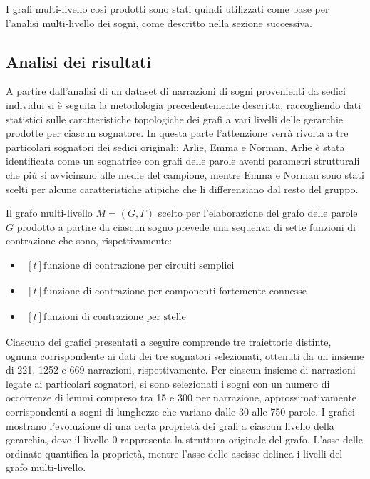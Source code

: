 I grafi multi-livello così prodotti sono stati quindi utilizzati come base per l'analisi multi-livello dei sogni,
come descritto nella sezione successiva.

\subsection{Analisi dei risultati}
A partire dall'analisi di un dataset di narrazioni di sogni provenienti da sedici individui si è seguita la
metodologia precedentemente descritta, raccogliendo dati statistici sulle caratteristiche topologiche
dei grafi a vari livelli delle gerarchie prodotte per ciascun sognatore.
In questa parte l'attenzione verrà rivolta a tre particolari sognatori dei sedici originali: Arlie, Emma e Norman.
Arlie è stata identificata come un sognatrice con grafi delle parole aventi parametri strutturali che più si
avvicinano alle medie del campione, mentre Emma e Norman sono stati scelti per alcune caratteristiche atipiche
che li differenziano dal resto del gruppo.

Il grafo multi-livello $M = (G, \Gamma)$ scelto per l'elaborazione del grafo delle parole $G$ prodotto a partire
da ciascun sogno prevede una sequenza di sette funzioni di contrazione che sono, rispettivamente:
\begin{itemize}
    \item {}
    $ \begin{aligned}[t]
      \text{funzione di contrazione per circuiti semplici}
      \end{aligned} $
    \item {}
    $ \begin{aligned}[t]
      \text{funzione di contrazione per componenti fortemente connesse}
      \end{aligned} $
    \item {}
    $ \begin{aligned}[t]
      \text{funzioni di contrazione per stelle}
      \end{aligned} $
\end{itemize}

Ciascuno dei grafici presentati a seguire comprende tre traiettorie distinte, ognuna corrispondente ai dati
dei tre sognatori selezionati, ottenuti da un insieme di 221, 1252 e 669 narrazioni, rispettivamente.
Per ciascun insieme di narrazioni legate ai particolari sognatori, si sono selezionati i sogni con un numero di
occorrenze di lemmi compreso tra 15 e 300 per narrazione, approssimativamente corrispondenti a sogni
di lunghezze che variano dalle 30 alle 750 parole.
I grafici mostrano l'evoluzione di una certa proprietà dei grafi a ciascun livello della gerarchia,
dove il livello $0$ rappresenta la struttura originale del grafo.
L'asse delle ordinate quantifica la proprietà, mentre l'asse delle ascisse delinea i livelli del grafo multi-livello.

